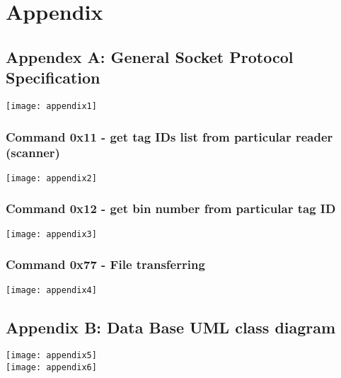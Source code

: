%
\section{Appendix}

\subsection{Appendex A: General Socket Protocol Specification}

\texttt{[image: appendix1]}

\subsubsection{Command 0x11 - get tag IDs list from particular reader (scanner)}

\texttt{[image: appendix2]}

\subsubsection{Command 0x12 - get bin number from particular tag ID}

\texttt{[image: appendix3]}

\subsubsection{Command 0x77 - File transferring}

\texttt{[image: appendix4]}

\newpage

\subsection{Appendix B: Data Base UML class diagram}

\texttt{[image: appendix5]}
\\
\texttt{[image: appendix6]}